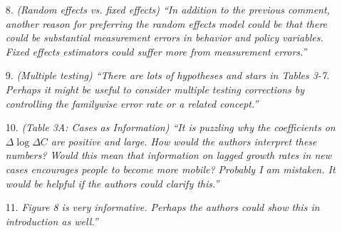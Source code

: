 \documentclass[11pt]{article}
\begin{document}
\begin{itemize}
\item[8.]  \textit{(Random effects vs. fixed effects) ``In addition to the previous comment, another reason for
preferring the random effects model could be that there could be substantial measurement
errors in behavior and policy variables. Fixed effects estimators could suffer more from measurement
errors.''}
  
\item[9.]  \textit{(Multiple testing) ``There are lots of hypotheses and stars in Tables 3-7. Perhaps it might be
useful to consider multiple testing corrections by controlling the familywise error rate or a
related concept.''}
  
\item[10.]  \textit{(Table 3A: Cases as Information) ``It is puzzling why the coefficients on  $\Delta\log\Delta C$ are positive
and large. How would the authors interpret these numbers? Would this mean that information
on lagged growth rates in new cases encourages people to become more mobile?
Probably I am mistaken. It would be helpful if the authors could clarify this.''}
\item[11.]  \textit{Figure 8 is very informative. Perhaps the authors could show this in introduction as well.''}
  
  \end{itemize}
  
  
\end{document}
